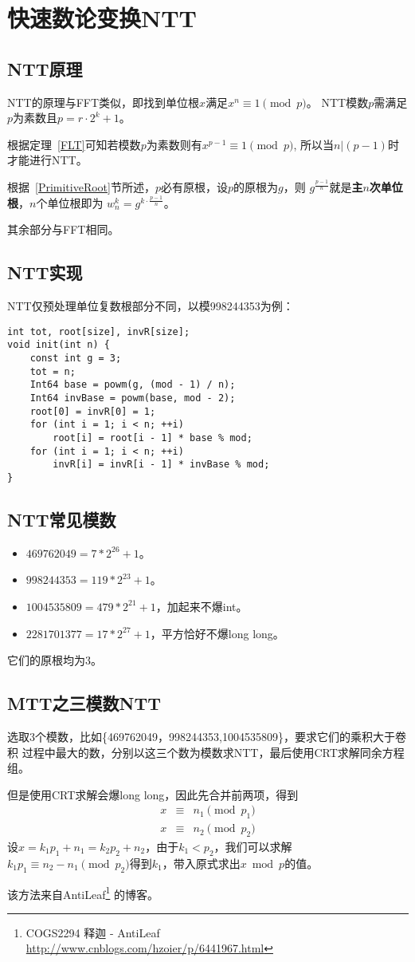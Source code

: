 \section{快速数论变换NTT}
\subsection{NTT原理}
NTT的原理与FFT类似，即找到单位根$x$满足$x^n\equiv 1 \pmod{p}$。
NTT模数$p$需满足$p$为素数且$p=r\cdot 2^k+1$。

根据定理~\ref{FLT}可知若模数$p$为素数则有$x^{p-1}\equiv 1 \pmod{p}$,
所以当$n|(p-1)$时才能进行NTT。

根据~\ref{PrimitiveRoot}节所述，$p$必有原根，设$p$的原根为$g$，则
$g^\frac{p-1}{n}$就是{\bfseries 主$n$次单位根}，$n$个单位根即为
$w_n^k=g^{k\cdot \frac{p-1}{n}}$。

其余部分与FFT相同。

\subsection{NTT实现}
NTT仅预处理单位复数根部分不同，以模998244353为例：
\begin{lstlisting}
int tot, root[size], invR[size];
void init(int n) {
    const int g = 3;
    tot = n;
    Int64 base = powm(g, (mod - 1) / n);
    Int64 invBase = powm(base, mod - 2);
    root[0] = invR[0] = 1;
    for (int i = 1; i < n; ++i)
        root[i] = root[i - 1] * base % mod;
    for (int i = 1; i < n; ++i)
        invR[i] = invR[i - 1] * invBase % mod;
}
\end{lstlisting}
\subsection{NTT常见模数}
\begin{itemize}
    \item $469762049=7*2^{26}+1$。
    \item $998244353=119*2^{23}+1$。
    \item $1004535809=479*2^{21}+1$，加起来不爆int。
    \item $2281701377=17*2^{27}+1$，平方恰好不爆long long。
\end{itemize}
它们的原根均为3。
\subsection{MTT之三模数NTT}
选取3个模数，比如\{469762049，998244353,1004535809\}，要求它们的乘积大于卷积
过程中最大的数，分别以这三个数为模数求NTT，最后使用CRT求解同余方程组。

但是使用CRT求解会爆long long，因此先合并前两项，得到
\begin{eqnarray*}
    x&\equiv&n_1 \pmod{p_1}\\
    x&\equiv&n_2 \pmod{p_2}
\end{eqnarray*}
设$x=k_1p_1+n_1=k_2p_2+n_2$，由于$k_1<p_2$，我们可以求解
$k_1p_1\equiv n_2-n_1 \pmod{p_2}$得到$k_1$，带入原式求出$x \bmod{p}$的值。

该方法来自AntiLeaf\footnote{COGS2294 释迦 - AntiLeaf
\url{http://www.cnblogs.com/hzoier/p/6441967.html}}
的博客。
